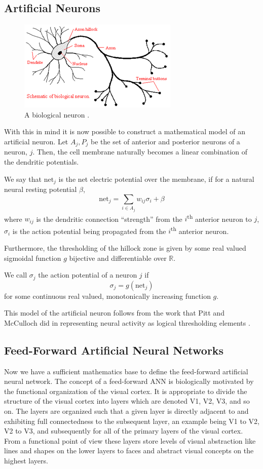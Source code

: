 \subsection{Artificial Neurons}
\begin{figure}
\centering
\includegraphics{neuron}
\caption{A biological neuron \cite{neuralimage}.}
\end{figure}
    With this in mind it is now possible to construct a mathematical model of an artificial neuron. Let \( A_j, P_j\) be the set of anterior and posterior neurons of a neuron, \(j\). Then, the cell membrane naturally becomes a linear combination of the dendritic potentials.
   \begin{definition}
   We say that \(\mathrm{net}_j\) is the net electric potential over the membrane, if for a natural neural resting potential \(\beta\), 
\[ \textrm{net}_j = \sum_{i \in A_j}{w_{ij}\sigma_i} + \beta \]where \(w_{ij}\) is the dendritic connection “strength” from the \(i\)\textsuperscript{th} anterior neuron to \(j\), \(\sigma_i\) is the action potential being propagated from the \(i\)\textsuperscript{th} anterior neuron. 
   \end{definition}
Furthermore, the thresholding of the hillock zone is given by some real valued sigmoidal function \(g\) bijective and differentiable over \(\mathbb{R}\). 
\begin{definition}
We call \(\sigma_j\) the action potential  of a neuron \(j\) if  
\[\sigma_j = g\left(\mathrm{net}_j\right)\]
for some continuous real valued, monotonically increasing function \(g\).
\end{definition}
This model of the artificial neuron follows from the work that Pitt and McCulloch did in representing neural activity as logical thresholding elements  \cite{mcculloch}.

\subsection{Feed-Forward Artificial Neural Networks}
    Now we have a sufficient mathematics base to define the feed-forward artificial neural network. The concept of a feed-forward ANN is biologically motivated by the functional organization of the visual cortex. It is appropriate to divide the structure of the visual cortex into layers which are denoted V1, V2, V3, and so on. The layers are organized such that a given layer is directly adjacent to and exhibiting full connectedness to the subsequent layer, an example being V1 to V2, V2 to V3, and subsequently for all of the primary layers of the visual cortex. From a functional point of view these layers store levels of visual abstraction like lines and shapes on the lower layers to faces and abstract visual concepts on the highest layers\cite{visualcortex}.

